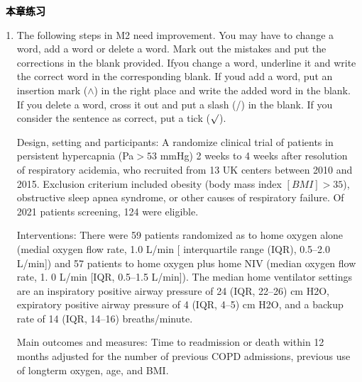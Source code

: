 \documentclass[a4paper]{ctexbook}
\newenvironment{problemset}[1][本章练习]{
  \begin{center}
    \phantomsection\addcontentsline{toc}{section}{\texorpdfstring{本章练习}{Exercice}}
    \markright{#1}
    \textcolor{black}{\Large\bfseries\adftripleflourishleft~#1~\adftripleflourishright}
  \end{center}
  \begin{enumerate}}{
  \end{enumerate}}
\begin{document}
\begin{problemset}
\begin{enumerate}
  \end{enumerate}

  \item The following steps in M2 need improvement. You may have to change a word, add a word or delete a word. Mark out the mistakes and put the corrections in the blank provided. Ifyou change a word, underline it and write the correct word in the corresponding blank. If youd add a word, put an insertion mark ($\wedge$) in the right place and write the added word in the blank. If you delete a word, cross it out and put a slash (/) in the blank. If you consider the sentence as correct, put a tick ($\surd$).
  
  \hspace*{2em}Design, setting and participants: A randomize clinical trial of patients in persistent hypercapnia (Pa$>53$ mmHg) 2 weeks to 4 weeks after resolution of respiratory acidemia, who recruited from 13 UK centers between 2010 and 2015. Exclusion criterium included obesity (body mass index $[BMI] >35$), obstructive sleep apnea syndrome, or other causes of respiratory failure. Of 2021 patients screening, 124 were eligible.

  \hspace*{2em}Interventions: There were 59 patients randomized as to home oxygen alone (medial oxygen flow rate, 1.0 L/min [ interquartile range (IQR), 0.5--2.0 L/min]) and 57 patients to home oxygen plus home NIV (median oxygen flow rate, 1. 0 L/min [IQR, 0.5--1.5 L/min]). The median home ventilator settings are an inspiratory positive airway pressure of 24 (IQR, 22--26) cm H2O, expiratory positive airway pressure of 4 (IQR, 4--5) cm H2O, and a backup rate of 14 (IQR, 14--16) breaths/minute.

  \hspace*{2em}Main outcomes and measures: Time to readmission or death within 12 months adjusted for the number of previous COPD admissions, previous use of longterm oxygen, age, and BMI.
  

\end{problemset}
\end{document}

